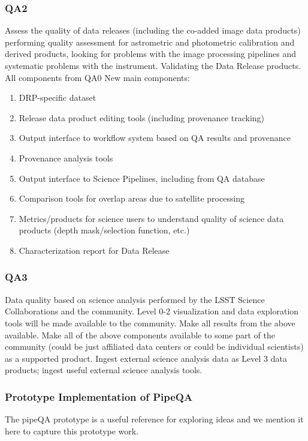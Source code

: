 \subsubsection{QA2}
Assess the quality of data releases (including the co-added image data products) performing quality assessment for astrometric and photometric calibration and derived products, looking for problems with the image processing pipelines and systematic problems with the instrument.
Validating the Data Release products.
All components from QA0
New main components:
\begin{enumerate}
\item DRP-specific dataset
\item Release data product editing tools (including provenance tracking)
\item Output interface to workflow system based on QA results and provenance
\item Provenance analysis tools
\item Output interface to Science Pipelines, including from QA database
\item Comparison tools for overlap areas due to satellite processing 
\item Metrics/products for science users to understand quality of science data products (depth mask/selection function, etc.)
\item Characterization report for Data Release
\end{enumerate}

\subsubsection{QA3}
Data quality based on science analysis performed by the LSST Science Collaborations and the community. Level 0-2 visualization and data exploration tools will be made available to the community.
Make all results from the above available. Make all of the above components available to some part of the community (could be just affiliated data centers or could be individual scientists) as a supported product.
Ingest external science analysis data as Level 3 data products; ingest useful external science analysis tools.

\subsubsection{Prototype Implementation of PipeQA}

The pipeQA prototype is a useful reference for exploring ideas and we mention
it here to capture this prototype work.

